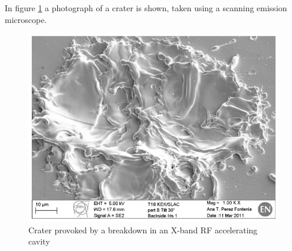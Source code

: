 In figure \ref{SEM_crater} a photograph of a crater is shown, taken using a scanning emission microscope.
\begin{figure}[h]
\centering
\includegraphics[scale=0.4]{pictures/crater}
\caption{Crater provoked by a breakdown in an X-band RF accelerating cavity \cite{Wuensch:advaces}}
\label{SEM_crater}
\end{figure}



